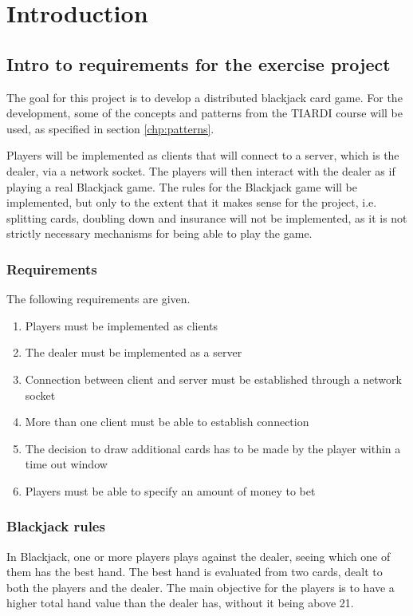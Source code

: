 \chapter{Introduction}
\label{chp:intro}

\section{Intro to requirements for the exercise project}

The goal for this project is to develop a distributed blackjack card game. For the development, some of the concepts and patterns from the TIARDI course will be used, as specified in section \ref{chp:patterns}. 

Players will be implemented as clients that will connect to a server, which is the dealer, via a network socket. The players will then interact with the dealer as if playing a real Blackjack game. The rules for the Blackjack game will be implemented, but only to the extent that it makes sense for the project, i.e. splitting cards, doubling down and insurance will not be implemented, as it is not strictly necessary mechanisms for being able to play the game. 

\subsection{Requirements}
The following requirements are given.
\begin{enumerate}  
	\item Players must be implemented as clients
	\item The dealer must be implemented as a server
	\item Connection between client and server must be established through a network socket
	\item More than one client must be able to establish connection
	\item The decision to draw additional cards has to be made by the player within a time out window
	\item Players must be able to specify an amount of money to bet
\end{enumerate}

\subsection{Blackjack rules}
In Blackjack, one or more players plays against the dealer, seeing which one of them has the best hand. The best hand is evaluated from two cards, dealt to both the players and the dealer. The main objective for the players is to have a higher total hand value than the dealer has, without it being above 21.
 
